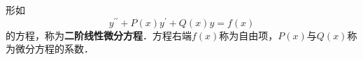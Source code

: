 形如
\begin{equation}
y^{\prime\prime}+P(x)y^\prime +Q(x)y=f(x)
\end{equation}
的方程，称为\textbf{二阶线性微分方程}．方程右端$f(x)$称为自由项，$P(x)$与$Q(x)$称为微分方程的系数．\\

